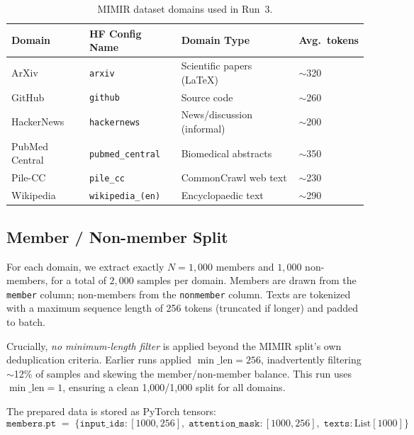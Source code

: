 \documentclass[11pt,a4paper]{article}
\begin{document}
\begin{table}[H]
\centering
\caption{MIMIR dataset domains used in Run~3.}
\begin{tabular}{llll}
\toprule
\textbf{Domain} & \textbf{HF Config Name} & \textbf{Domain Type} & \textbf{Avg.\ tokens} \\
\midrule
ArXiv          & \texttt{arxiv}               & Scientific papers (LaTeX)   & $\sim$320 \\
GitHub         & \texttt{github}              & Source code                 & $\sim$260 \\
HackerNews     & \texttt{hackernews}          & News/discussion (informal)  & $\sim$200 \\
PubMed Central & \texttt{pubmed\_central}     & Biomedical abstracts        & $\sim$350 \\
Pile-CC        & \texttt{pile\_cc}            & CommonCrawl web text        & $\sim$230 \\
Wikipedia      & \texttt{wikipedia\_(en)}     & Encyclopaedic text          & $\sim$290 \\
\bottomrule
\end{tabular}
\end{table}

\subsection{Member / Non-member Split}
\label{sec:split}

For each domain, we extract exactly $N = 1{,}000$ members and $1{,}000$
non-members, for a total of $2{,}000$ samples per domain.  Members are drawn
from the \texttt{member} column; non-members from the \texttt{nonmember}
column. Texts are tokenized with a maximum sequence length of 256 tokens
(truncated if longer) and padded to batch.

Crucially, \emph{no minimum-length filter} is applied beyond the MIMIR split's
own deduplication criteria. Earlier runs applied $\min\_\text{len} = 256$,
inadvertently filtering $\sim$12\% of samples and skewing the
member/non-member balance. This run uses $\min\_\text{len} = 1$, ensuring a
clean 1{,}000/1{,}000 split for all domains.

The prepared data is stored as PyTorch tensors:
\[
  \texttt{members.pt} \;=\; \{\texttt{input\_ids}: [1000, 256],\;
  \texttt{attention\_mask}: [1000, 256],\; \texttt{texts}: \text{List}[1000]\}
\]

\end{document}
